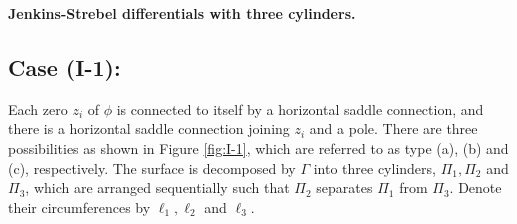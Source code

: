 \documentclass[11pt]{amsart}
\theoremstyle{plain}
\begin{document}
\medskip
\noindent
{\bf Jenkins-Strebel differentials with three cylinders.}

\subsection*{Case (I-1):} \label{case-I-1} Each zero $z_i$ of $\phi$ is connected to itself by a horizontal saddle connection, and there is a horizontal saddle connection joining $z_i$ and a pole. 
There are three possibilities as shown in Figure \ref{fig:I-1},
which are referred to as type (a), (b) and (c), respectively. 
The surface is decomposed by $\Gamma$ into three cylinders, $\Pi_1, \Pi_2$ and $\Pi_3$,  which are arranged sequentially such that $\Pi_2$ separates $\Pi_1$ from $\Pi_3$. 
Denote their circumferences by $\ell_1,\ell_2$ and $\ell_3$.
\end{document}
